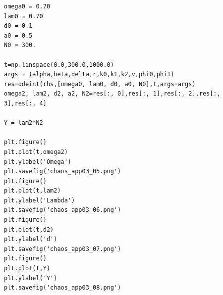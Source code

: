 \documentclass[12pt,fleqn]{article}\usepackage{../../common}
\begin{document}
\begin{verbatim}
omega0 = 0.70
lam0 = 0.70
d0 = 0.1
a0 = 0.5
N0 = 300.

t=np.linspace(0.0,300.0,1000.0)
args = (alpha,beta,delta,r,k0,k1,k2,v,phi0,phi1)
res=odeint(rhs,[omega0, lam0, d0, a0, N0],t,args=args)
omega2, lam2, d2, a2, N2=res[:, 0],res[:, 1],res[:, 2],res[:, 3],res[:, 4]

Y = lam2*N2

plt.figure()
plt.plot(t,omega2)
plt.ylabel('Omega')
plt.savefig('chaos_app03_05.png')
plt.figure()
plt.plot(t,lam2)
plt.ylabel('Lambda')
plt.savefig('chaos_app03_06.png')
plt.figure()
plt.plot(t,d2)
plt.ylabel('d')
plt.savefig('chaos_app03_07.png')
plt.figure()
plt.plot(t,Y)
plt.ylabel('Y')
plt.savefig('chaos_app03_08.png')
\end{verbatim}
\end{document}
